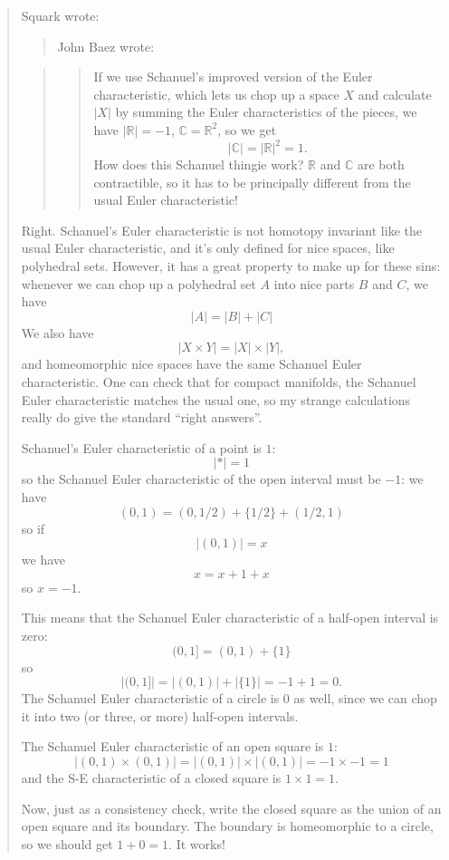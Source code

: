 \documentclass{article}
\begin{document}
\begin{quote}
Squark wrote:

\begin{quote}
John Baez wrote:
\end{quote}

\begin{quote}
\begin{quote}
If we use Schanuel's improved version of the Euler characteristic, which
lets us chop up a space \(X\) and calculate \(|X|\) by summing the Euler
characteristics of the pieces, we have \(|\mathbb{R}| = -1\),
\(\mathbb{C} = \mathbb{R}^2\), so we get
\[|\mathbb{C}| = |\mathbb{R}|^2 = 1.\] How does this Schanuel thingie
work? \(\mathbb{R}\) and \(\mathbb{C}\) are both contractible, so it has
to be principally different from the usual Euler characteristic!
\end{quote}
\end{quote}

Right. Schanuel's Euler characteristic is not homotopy invariant like
the usual Euler characteristic, and it's only defined for nice spaces,
like polyhedral sets. However, it has a great property to make up for
these sins: whenever we can chop up a polyhedral set \(A\) into nice
parts \(B\) and \(C\), we have \[|A| = |B| + |C|\] We also have
\[|X\times Y| = |X| \times |Y|,\] and homeomorphic nice spaces have the
same Schanuel Euler characteristic. One can check that for compact
manifolds, the Schanuel Euler characteristic matches the usual one, so
my strange calculations really do give the standard ``right answers''.

Schanuel's Euler characteristic of a point is \(1\): \[|*| = 1\] so the
Schanuel Euler characteristic of the open interval must be \(-1\): we
have \[(0,1) = (0,1/2) + \{1/2\} + (1/2,1)\] so if \[|(0,1)| = x\] we
have \[x = x + 1 + x\] so \(x = -1\).

This means that the Schanuel Euler characteristic of a half-open
interval is zero: \[(0,1] = (0,1) + \{1\}\] so
\[|(0,1]| = |(0,1)| + |\{1\}| = -1+1 = 0.\] The Schanuel Euler
characteristic of a circle is \(0\) as well, since we can chop it into
two (or three, or more) half-open intervals.

The Schanuel Euler characteristic of an open square is \(1\):
\[|(0,1)\times(0,1)| = |(0,1)|\times|(0,1)| = -1\times-1 = 1\] and the
S-E characteristic of a closed square is \(1\times1 = 1\).

Now, just as a consistency check, write the closed square as the union
of an open square and its boundary. The boundary is homeomorphic to a
circle, so we should get \(1 + 0 = 1\). It works!


\end{quote}
\end{document}
